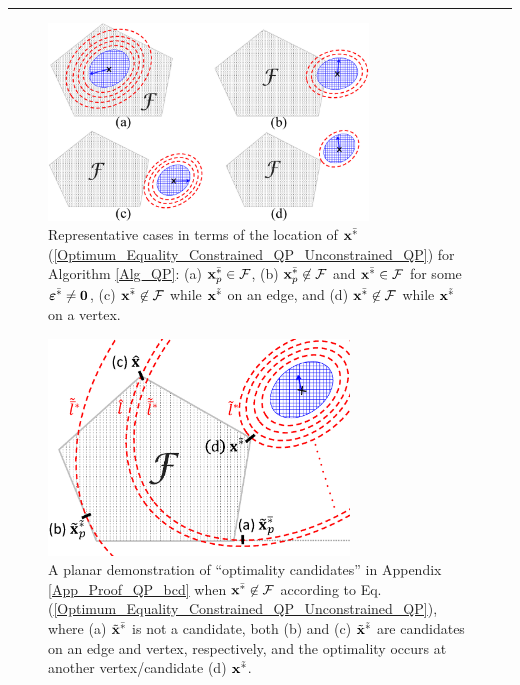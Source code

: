 \documentclass{imaman}
\newcommand{\bfx}{{\bf x}}
\newcommand{\bfvarepsilon}{{\boldsymbol \varepsilon}}
\newcommand{\bfzero}{{\bf 0}}
\newcommand{\calF}{{\mathcal F}}
\numberwithin{equation}{section}
\begin{document}
\hrule
\vspace{-0.1cm}

\begin{figure}[htbp]
    \begin{center}
    \includegraphics[width=8.5cm]{Fig_Locations.eps}
    \caption{Representative cases in terms of the location of $\bfx^{\bar *}$ {\rm(\ref{Optimum_Equality_Constrained_QP_Unconstrained_QP})} for Algorithm {\rm\ref{Alg_QP}}: (a) $\bfx_p^{\bar *}\in\calF$, (b) $\bfx_p^{\bar *}\not\in\calF$ and $\bfx^{\bar *}\in\calF$ for some $\bfvarepsilon^{\bar *}\ne\bfzero$, (c) $\bfx^{\bar *}\not\in\calF$ while $\bfx^{\tilde *}$ on an edge, and (d) $\bfx^{\bar *}\not\in\calF$ while $\bfx^{\tilde *}$ on a vertex.}
    \label{Fig_Locations}
    \end{center}
\end{figure}

\begin{figure}[htbp]
    \begin{center}
    \includegraphics[width=8cm]{Fig_Candidates.eps}
    \caption{A planar demonstration of ``optimality candidates'' in Appendix {\rm\ref{App_Proof_QP_bcd}} when $\bfx^{\bar *}\not\in\calF$ according to Eq. {\rm(\ref{Optimum_Equality_Constrained_QP_Unconstrained_QP})}, where (a) $\tilde\bfx^{\bar *}$ is not a candidate, both (b) and (c) $\tilde\bfx^{\tilde *}$ are candidates on an edge and vertex, respectively, and the optimality occurs at another vertex/candidate (d) $\bfx^{\tilde *}$.}
    \label{Fig_Candidates}
    \end{center}
\end{figure}
\end{document}
